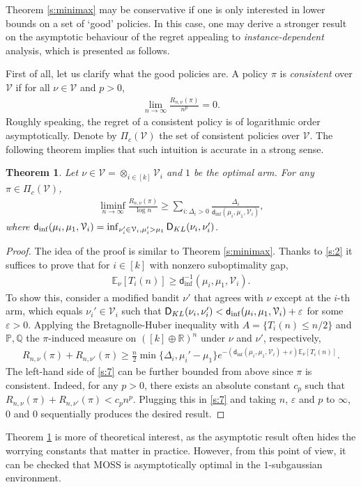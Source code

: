 \documentclass[10pt,a4paper]{amsart}
\numberwithin{equation}{section}
\theoremstyle{plain}
\newtheorem{Th}{Theorem}
\theoremstyle{definition}
\def\R{{\mathbb R}}
\def\Q{{\mathbb Q}}
\def\E{{\mathbb E}}
\def\R{{\mathbb R}}
\def\P{{\mathbb P}}
\def\V{{\mathcal V}}
\def\e{{\varepsilon}}
\begin{document}
Theorem \ref{s:minimax} may be conservative if one is only interested in lower bounds on a set of `good' policies. In this case, one may derive a stronger result on the asymptotic behaviour of the regret appealing to \emph{instance-dependent} analysis, which is presented as follows.  

First of all, let us clarify what the good policies are. A policy $\pi$ is \emph{consistent} over $\V$ if for all $\nu\in\V$ and $p>0$, 
\begin{align*}
\lim_{n\rightarrow\infty}\frac{R_{n, \nu}(\pi)}{n^p} = 0. 
\end{align*}
Roughly speaking, the regret of a consistent policy is of logarithmic order asymptotically. Denote by $\Pi_{c}(\V)$ the set of consistent policies over $\V$. The following theorem implies that such intuition is accurate in a strong sense. 

\begin{Th}\label{s:ins}
Let $\nu\in\V = \otimes_{i\in [k]} \V_i$ and $1$ be the optimal arm. For any $\pi\in\Pi_c(\V)$,
\begin{align}
\liminf_{n\rightarrow\infty}\frac{R_{n,\nu}(\pi)}{\log n}\geq \sum_{i: \Delta_i>0}\frac{\Delta_i}{\mathsf d_{\inf} (\mu_i, \mu_1, \V_i)}, 
\end{align}
where $\mathsf d_{\inf} (\mu_i, \mu_1, \V_i) = \inf_{\nu_i'\in\V_i, \mu_i'>\mu_1}\textsf D_{KL}(\nu_i, \nu_i')$. 
\end{Th}
\begin{proof}
The idea of the proof is similar to Theorem \ref{s:minimax}. Thanks to \eqref{s:2} it suffices to prove that for $i\in [k]$ with nonzero suboptimality gap, 
\begin{align*}
\E_\nu[T_i(n)]\geq \mathsf d^{-1}_{\inf} (\mu_i, \mu_1, \V_i).
\end{align*}
To show this, consider a modified bandit $\nu'$ that agrees with $\nu$ except at the $i$-th arm, which equals $\nu_i'\in\V_i$ such that $\textsf D_{KL}(\nu_i, \nu_i') < \mathsf d_{\inf} (\mu_i, \mu_1, \V_i)+\e$ for some $\e>0$. Applying the Bretagnolle-Huber inequality with $A = \{T_i(n)\leq n/2\}$ and $\P, \Q$ the $\pi$-induced measure on $([k]\oplus\R)^n$ under $\nu$ and $\nu'$, respectively, 
\begin{align}
R_{n, \nu}(\pi)+R_{n, \nu'}(\pi)\geq\frac{n}{2}\min\{\Delta_i, \mu_i'-\mu_1\}e^{-(\mathsf d_{\inf} (\mu_i, \mu_1, \V_i)+\e)\E_\nu[T_i(n)]}.\label{s:7}
\end{align}
The left-hand side of \eqref{s:7} can be further bounded from above since $\pi$ is consistent. Indeed, for any $p>0$, there exists an absolute constant $c_p$ such that $R_{n, \nu}(\pi)+R_{n, \nu'}(\pi)<c_pn^p$. Plugging this in \eqref{s:7} and taking $n$, $\e$ and $p$ to $\infty$, $0$ and $0$ sequentially produces the desired result. 
\end{proof}
Theorem \ref{s:ins} is more of theoretical interest, as the asymptotic result often hides the worrying constants that matter in practice. However, from this point of view, it can be checked that MOSS is asymptotically optimal in the $1$-subgaussian environment.   
\end{document}

